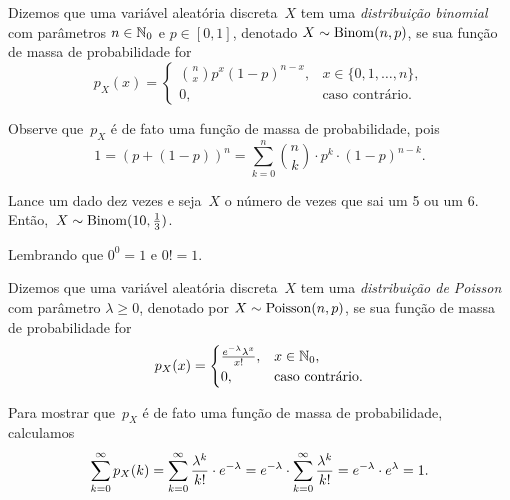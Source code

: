 \begin{definition}
Dizemos que uma variável aleatória discreta~$X$ tem uma
\emph{distribuição binomial} com parâmetros $ n\in\mathbb{N}_0 $ e $p \in [0,1]$,
denotado
$X \sim \mathrm{Binom} (n,p)$,
se sua função de massa de probabilidade for
\[
p_X(x) =
\begin{cases}
\binom{n}{x} p^x (1-p)^{n-x} ,& x\in \{0,1,\dots,n\},
\\
0 ,& \text{caso contrário.}
\end{cases}
\]
\end{definition}

Observe que~$p_X$ é de fato uma função de massa de probabilidade, pois
\[1 = (p+(1-p))^n = \sum_{k=0}^n \binom{n}{k} \cdot p^k \cdot (1-p)^{n-k}.\]

\begin{example} 
Lance um dado dez vezes e seja~$X$ o número de vezes que sai um 5 ou um 6. Então,~$X \sim \mathrm{Binom} (10,\tfrac13)$.
\end{example}

Lembrando que $ 0^0 = 1 $ e $ 0! = 1 $.

\begin{definition}
Dizemos que uma variável aleatória discreta~$X$ tem uma
\emph{distribuição de Poisson} com parâmetro $ \lambda \geq 0 $,
denotado
por
$X \sim \mathrm{Poisson} (n,p)$,
se sua função de massa de probabilidade for
\[
p_X(x) =
\begin{cases}
\frac{e^{-\lambda}\lambda^x}{x!}
,& x\in \mathbb{N}_0,
\\
0 ,& \text{caso contrário.}
\end{cases}
\]
\end{definition}

Para mostrar que~$p_X$ é de fato uma função de massa de probabilidade, calculamos
\[\sum_{k=0}^\infty p_X(k) = \sum_{k=0}^\infty \frac{\lambda^k}{k!}\cdot e ^{-\lambda} = e ^{-\lambda}\cdot \sum_{k=0}^\infty \frac{\lambda^k}{k!} = e ^{-\lambda} \cdot e ^\lambda = 1.\]

